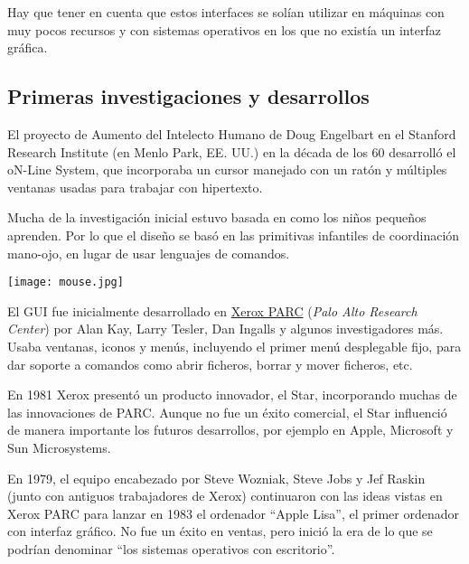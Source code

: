 Hay que tener en cuenta que estos interfaces se solían utilizar en máquinas con muy pocos recursos y con sistemas operativos en los que no existía un interfaz gráfica.


\subsection{Primeras investigaciones y desarrollos}

El proyecto de Aumento del Intelecto Humano de Doug Engelbart en el Stanford Research Institute (en Menlo Park, EE. UU.) en la década de los 60 desarrolló el oN-Line System, que incorporaba un cursor manejado con un ratón y múltiples ventanas usadas para trabajar con hipertexto.

Mucha de la investigación inicial estuvo basada en como los niños pequeños aprenden. Por lo que el diseño se basó en las primitivas infantiles de coordinación mano-ojo, en lugar de usar lenguajes de comandos.

\vspace{-10pt}
\begin{center}
    \texttt{[image: mouse.jpg]}
    \vspace{-5pt}
\end{center}
\vspace{-20pt}

El GUI fue inicialmente desarrollado en \href{https://es.wikipedia.org/wiki/PARC}{Xerox PARC} (\textit{Palo Alto Research Center}) por Alan Kay, Larry Tesler, Dan Ingalls y algunos investigadores más. Usaba ventanas, iconos y menús, incluyendo el primer menú desplegable fijo, para dar soporte a comandos como abrir ficheros, borrar y mover ficheros, etc.

En 1981 Xerox presentó un producto innovador, el Star, incorporando muchas de las innovaciones de PARC. Aunque no fue un éxito comercial, el Star influenció de manera importante los futuros desarrollos, por ejemplo en Apple, Microsoft y Sun Microsystems.


En 1979, el equipo encabezado por Steve Wozniak, Steve Jobs y Jef Raskin (junto con antiguos trabajadores de Xerox) continuaron con las ideas vistas en Xerox PARC para lanzar en 1983 el ordenador “Apple Lisa”, el primer ordenador con interfaz gráfico. No fue un éxito en ventas, pero inició la era de lo que se podrían denominar “los sistemas operativos con escritorio”.

